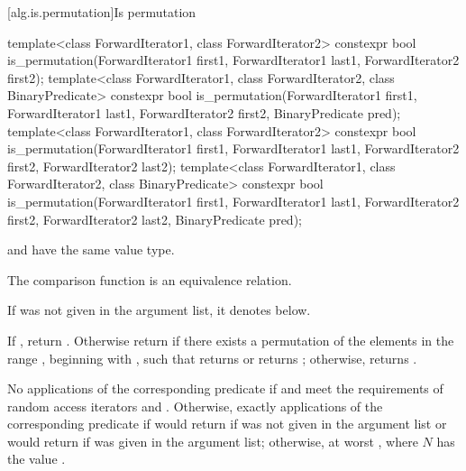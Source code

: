 [alg.is.permutation]{Is permutation}

%
\begin{itemdecl}
template<class ForwardIterator1, class ForwardIterator2>
  constexpr bool is_permutation(ForwardIterator1 first1, ForwardIterator1 last1,
                                ForwardIterator2 first2);
template<class ForwardIterator1, class ForwardIterator2,
         class BinaryPredicate>
  constexpr bool is_permutation(ForwardIterator1 first1, ForwardIterator1 last1,
                                ForwardIterator2 first2, BinaryPredicate pred);
template<class ForwardIterator1, class ForwardIterator2>
  constexpr bool is_permutation(ForwardIterator1 first1, ForwardIterator1 last1,
                                ForwardIterator2 first2, ForwardIterator2 last2);
template<class ForwardIterator1, class ForwardIterator2,
         class BinaryPredicate>
  constexpr bool is_permutation(ForwardIterator1 first1, ForwardIterator1 last1,
                                ForwardIterator2 first2, ForwardIterator2 last2,
                                BinaryPredicate pred);
\end{itemdecl}

\begin{itemdescr}

\pnum
\mandates
{} and  have the same value type.

\pnum
\expects
The comparison function is an equivalence relation.

\pnum
\remarks
If  was not given in the argument list,
it denotes  below.

\pnum
\returns
If , return .
Otherwise return 
if there exists a permutation of the elements
in the range ,
beginning with ,
such that  returns  or
 returns ;
otherwise, returns .

\pnum
\complexity
No applications of the corresponding predicate
if  and 
meet the requirements of random access iterators and
.
Otherwise, exactly  applications
of the corresponding predicate
if  would return 
if  was not given in the argument list or
 would return 
if  was given in the argument list;
otherwise, at worst , where $N$ has the value .
\end{itemdescr}

